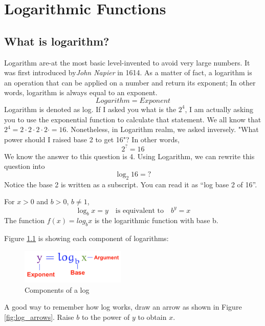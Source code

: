 \chapter{Logarithmic Functions}
\section{What is logarithm?}
Logarithm are-at the most basic level-invented to avoid very large numbers. It was first
introduced by\textit{John Napier} in 1614. As a matter of fact, a logarithm is an
operation that can be applied on a number and return its exponent; In other words,
logarithm is always equal to an exponent. \[
								Logarithm = Exponent
											\]  
Logarithm is denoted as log. If I asked you what is the $2^4$, I am actually asking you 
to use the exponential function to calculate that statement. We all know that 
$2^4=2\cdot2\cdot2\cdot2\cdot=16$. Nonetheless, in Logarithm realm, we asked inversely. 
"What power should I raised base 2 to get 16"? In other words,\[
								2^? = 16
											\]
We know the answer to this question is 4. Using Logarithm, we can rewrite this question 
into			\[
						\log_{2}16 =?				
				\]
Notice the base 2 is written as a subscript. You can read it as “log base 2 of 16”. 
	\begin{tcolorbox}[title=Logarithmic function, 
	                fonttitle=\bfseries,
	                colframe=blue!70!black,
	                colback=white]
		For $x>0$ and $b>0$, $b\neq1$,
		\begin{equation}
			\log_{b}x=y\quad \text{is equivalent to}\quad  b^y=x
			\label{log}
		\end{equation}
		The function $f(x)= log_{b}x$ is the logarithmic function with base b.
	\end{tcolorbox}
Figure \ref{fig:log} is showing each component of logarithms:
		\begin{figure}[H]
		 \includegraphics[width=5cm]{pics/Log.png}
		 \centering
		 \caption{Components of a log}
		 \label{fig:log}
		\end{figure}
A good way to remember how log works, draw an arrow as shown in Figure \ref{fig:log_arrows}. Raise $b$ to the power of $y$ to obtain $x$.
